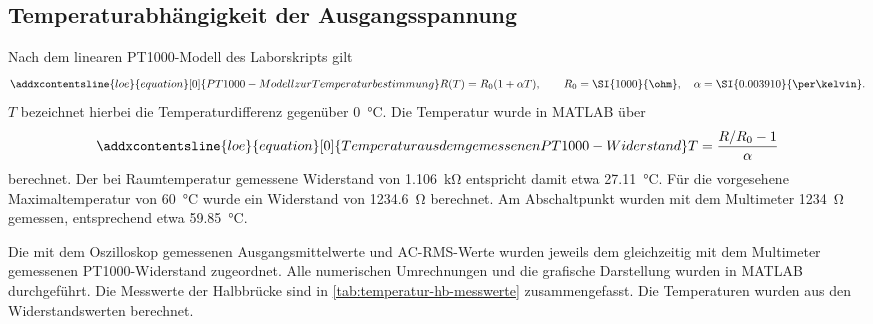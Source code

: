 \documentclass[11pt,a4paper]{scrartcl}
\begin{document}
\subsection{Temperaturabhängigkeit der Ausgangsspannung}
Nach dem linearen PT1000-Modell des Laborskripts gilt
\begin{equation}
  \addxcontentsline{loe}{equation}[\theequation]{PT1000-Modell zur Temperaturbestimmung}
  R(T)=R_0(1+\alpha T),\qquad
  R_0=\SI{1000}{\ohm},\quad
  \alpha=\SI{0.003910}{\per\kelvin}.
  \label{eq:temperatur-pt1000-modell}
\end{equation}
$T$ bezeichnet hierbei die Temperaturdifferenz gegenüber \SI{0}{\celsius}.
Die Temperatur wurde in MATLAB über
\begin{equation}
  \addxcontentsline{loe}{equation}[\theequation]{Temperatur aus dem gemessenen PT1000-Widerstand}
  T=\frac{R/R_0-1}{\alpha}
  \label{eq:temperatur-pt1000-umrechnung}
\end{equation}
berechnet.
Der bei Raumtemperatur gemessene Widerstand von \SI{1.106}{\kilo\ohm} entspricht damit etwa \SI{27.11}{\celsius}.
Für die vorgesehene Maximaltemperatur von \SI{60}{\celsius} wurde ein Widerstand von \SI{1234.6}{\ohm} berechnet.
Am Abschaltpunkt wurden mit dem Multimeter \SI{1234}{\ohm} gemessen, entsprechend etwa \SI{59.85}{\celsius}.

Die mit dem Oszilloskop gemessenen Ausgangsmittelwerte und AC-RMS-Werte wurden jeweils dem gleichzeitig mit dem Multimeter gemessenen PT1000-Widerstand zugeordnet.
Alle numerischen Umrechnungen und die grafische Darstellung wurden in MATLAB durchgeführt.
Die Messwerte der Halbbrücke sind in \cref{tab:temperatur-hb-messwerte} zusammengefasst.
Die Temperaturen wurden aus den Widerstandswerten berechnet.
\end{document}
